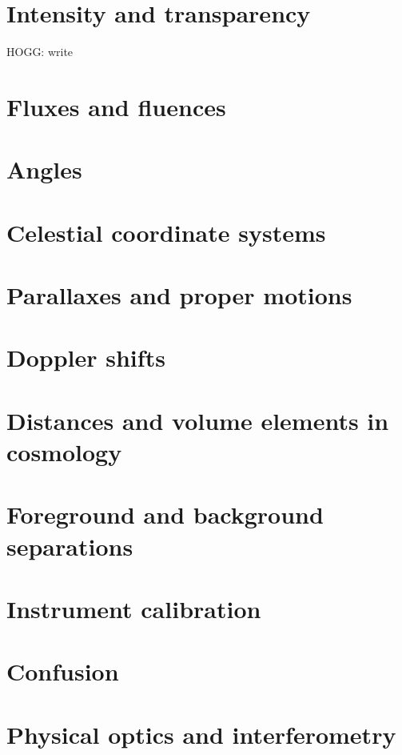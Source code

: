\documentclass{book}
\begin{document}
\chapter{Intensity and transparency}\label{chap:intensity}
HOGG: write

\chapter{Fluxes and fluences}

\chapter{Angles}

\chapter{Celestial coordinate systems}

\chapter{Parallaxes and proper motions}

\chapter{Doppler shifts}

\chapter{Distances and volume elements in cosmology}

\chapter{Foreground and background separations}

\chapter{Instrument calibration}

\chapter{Confusion}

\chapter{Physical optics and interferometry}\label{chap:physical}
\end{document}
